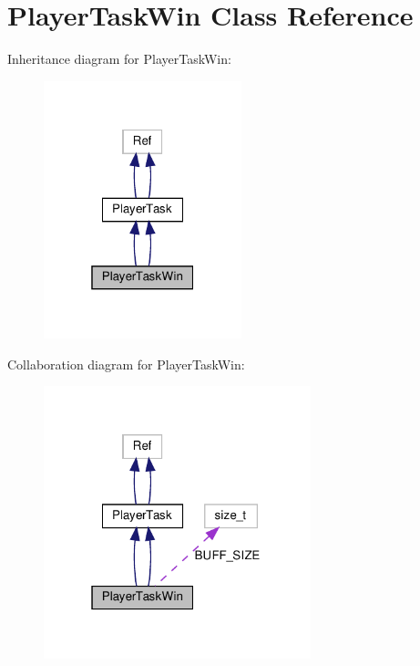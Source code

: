 \hypertarget{classPlayerTaskWin}{}\section{Player\+Task\+Win Class Reference}
\label{classPlayerTaskWin}


Inheritance diagram for Player\+Task\+Win\+:
\nopagebreak
\begin{figure}[H]
\begin{center}
\leavevmode
\includegraphics[width=163pt]{classPlayerTaskWin__inherit__graph}
\end{center}
\end{figure}


Collaboration diagram for Player\+Task\+Win\+:
\nopagebreak
\begin{figure}[H]
\begin{center}
\leavevmode
\includegraphics[width=220pt]{classPlayerTaskWin__coll__graph}
\end{center}
\end{figure}

